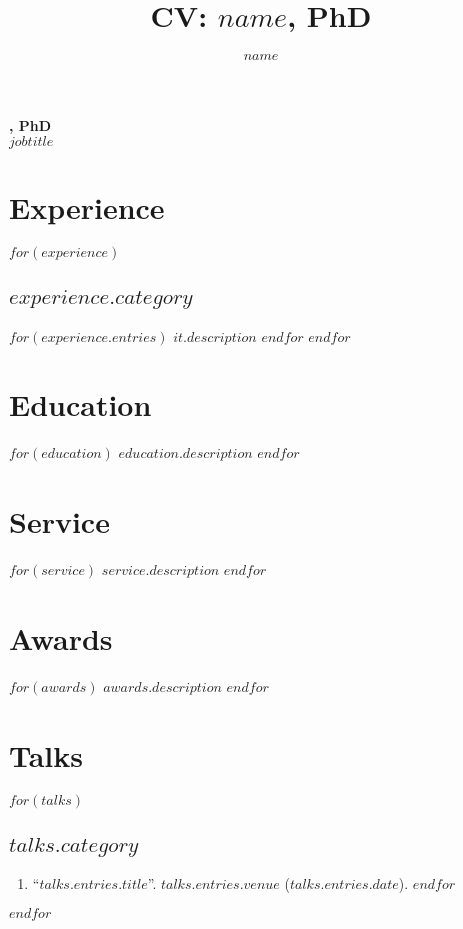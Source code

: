 \documentclass[11pt]{article}
\title{CV: $name$, PhD}
\author{$name$}
\date{}
\makeatletter
\renewcommand\maketitle{
    {\noindent\Large\sffamily\bfseries \@author, PhD\\
		\large\normalfont\itshape $jobtitle$}
  }
\makeatother
\begin{document}
%
\thispagestyle{empty}

\maketitle

\section{Experience}
$for(experience)$
\subsection{$experience.category$}
$for(experience.entries)$
$it.description$
$endfor$
$endfor$

\section{Education}
$for(education)$
$education.description$
$endfor$

\section{Service}
$for(service)$
$service.description$
$endfor$

\section{Awards}
$for(awards)$
$awards.description$
$endfor$

\section{Talks}
$for(talks)$
\subsection{$talks.category$}
\begin{enumerate}
$for(talks.entries)$
\item ``\href{$talks.entires.link$}{$talks.entries.title$}''. $talks.entries.venue$ ($talks.entries.date$).
$endfor$
\end{enumerate}
$endfor$
\end{document}

